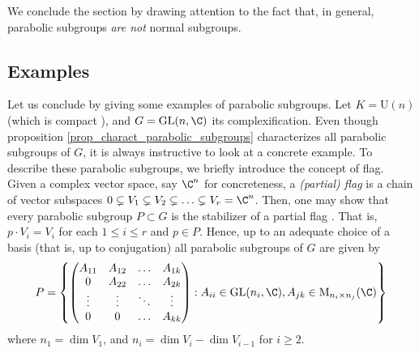 We conclude the section by drawing attention to the fact that, in general, parabolic subgroups \textit{are not} normal subgroups.

\subsection{Examples}
Let us conclude by giving some examples of parabolic subgroups. Let \(K=\mathrm{U}(n)\) (which is compact \parencite[Lemma 2.1.4]{hilgert2011structure}), and \(G=\mathrm{GL}(n, \C)\) its complexification. Even though proposition \ref{prop_charact_parabolic_subgroups} characterizes all parabolic subgroups of \(G\), it is always instructive to look at a concrete example. To describe these parabolic subgroups, we briefly introduce the concept of flag. Given a complex vector space, say \(\C^n\) for concreteness, a \textit{(partial) flag} is a chain of vector subspaces \(0 \subsetneq V_1 \subsetneq V_2 \subsetneq \ldots \subsetneq V_r=\C^n\). Then, one may show that every parabolic subgroup \(P \subset G\) is the stabilizer of a partial flag \parencite[Sec. 21.3 Cor. B]{humphreys1975linear}. That is, \(p\cdot V_i=V_i\) for each \(1 \le i \leq r\) and \(p\in P\). Hence, up to an adequate choice of a basis (that is, up to conjugation) all parabolic subgroups of \(G\) are given by
\[
P=\left\lbrace
\begin{pmatrix}
    A_{11} & A_{12} & \ldots & A_{1k} \\
    0 & A_{22} & \ldots & A_{2k} \\
    \vdots & \vdots & \ddots & \vdots \\
    0 & 0 & \ldots & A_{kk} 
\end{pmatrix} :  A_{ii}\in \mathrm{GL}(n_i, \C), A_{jk} \in \mathrm{M}_{n_i \times n_j}(\C)
\right\rbrace
\]
where \(n_1=\dim V_1\), and \(n_i=\dim V_i-\dim V_{i-1}\) for \(i \geq 2\). 


